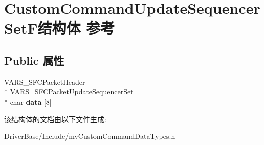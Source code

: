 \hypertarget{struct_custom_command_update_sequencer_set_f}{\section{Custom\+Command\+Update\+Sequencer\+Set\+F结构体 参考}
\label{struct_custom_command_update_sequencer_set_f}
}
\subsection*{Public 属性}
\begin{DoxyCompactItemize}
\item 
\hypertarget{struct_custom_command_update_sequencer_set_f_abc29a506bbb923e512ceaad8e95bdb21}{V\+A\+R\+S\+\_\+\+S\+F\+C\+Packet\+Header \\*
V\+A\+R\+S\+\_\+\+S\+F\+C\+Packet\+Update\+Sequencer\+Set \\*
char {\bfseries data} \mbox{[}8\mbox{]}}\label{struct_custom_command_update_sequencer_set_f_abc29a506bbb923e512ceaad8e95bdb21}

\end{DoxyCompactItemize}


该结构体的文档由以下文件生成\+:\begin{DoxyCompactItemize}
\item 
Driver\+Base/\+Include/mv\+Custom\+Command\+Data\+Types.\+h\end{DoxyCompactItemize}
